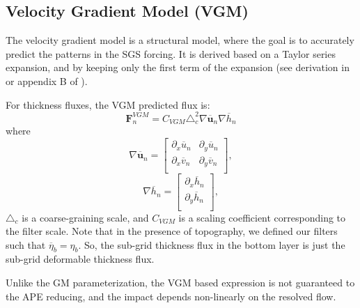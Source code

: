 \documentclass[draft,ms]{agutexSI2019}
\begin{document}
\begin{article}
\section{Velocity Gradient Model (VGM)}
\label{app:VGM}

The velocity gradient model is a structural model, where the goal is to accurately predict the patterns in the SGS forcing.  It is derived based on a Taylor series expansion, and by keeping only the first term of the expansion (see derivation in  or appendix B of ). 


For thickness fluxes, the VGM predicted flux is: 
\begin{equation}
    \mathbf{F}_n^{VGM} = C_{VGM} \triangle_c^2 \nabla \overline{\mathbf{u}}_n \nabla \overline{h}_n
\end{equation}
where 
\begin{equation}
    \nabla \overline{\mathbf{u}}_n = 
    \begin{bmatrix}
        \partial_x \overline{u}_n & \partial_y \overline{u}_n \\
        \partial_x \overline{v}_n & \partial_y \overline{v}_n \\
    \end{bmatrix},
\end{equation} 
\begin{equation}
    \nabla \overline{h}_n = 
    \begin{bmatrix}
        \partial_x \overline{h}_n \\
        \partial_y \overline{h}_n \\
    \end{bmatrix},
\end{equation}
$\triangle_c$ is a coarse-graining scale, and $C_{VGM}$ is a scaling coefficient corresponding to the filter scale. Note that in the presence of topography, we defined our filters such that $\overline{\eta}_b = \eta_b$. So, the sub-grid thickness flux in the bottom layer is just the sub-grid deformable thickness flux. 

Unlike the GM parameterization, the VGM based expression is not guaranteed to the APE reducing, and the impact depends non-linearly on the resolved flow.





\end{article}
\end{document}
